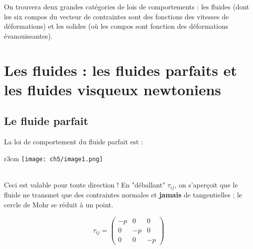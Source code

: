 On trouvera deux grandes catégories de lois de comportements : les fluides (dont les six compos 
du vecteur de contraintes sont des fonctions des vitesses de déformations) et les solides (où 
les compos sont fonction des déformations évanouissantes).

\section{Les fluides : les fluides parfaits et les fluides visqueux newtoniens}
    \subsection{Le fluide parfait}
    La loi de comportement du fluide parfait est : \\
    \begin{wrapfigure}[2]{r}{3cm}
        \texttt{[image: ch5/image1.png]}
        \end{wrapfigure}
        
    \ \\
    
    Ceci est valable pour toute direction ! En "déballant" $\tau_{ij}$, on s'aperçoit que le
    fluide ne transmet que des contraintes normales et \textbf{jamais} de tangentielles ; le
    cercle de Mohr se réduit à un point.
    
    \begin{equation}
    \tau_{ij} =
    \begin{pmatrix}
    -p &   0 &  0 \\
     0  & -p &  0 \\
     0  &  0 & -p
    \end{pmatrix}
    \end{equation}

